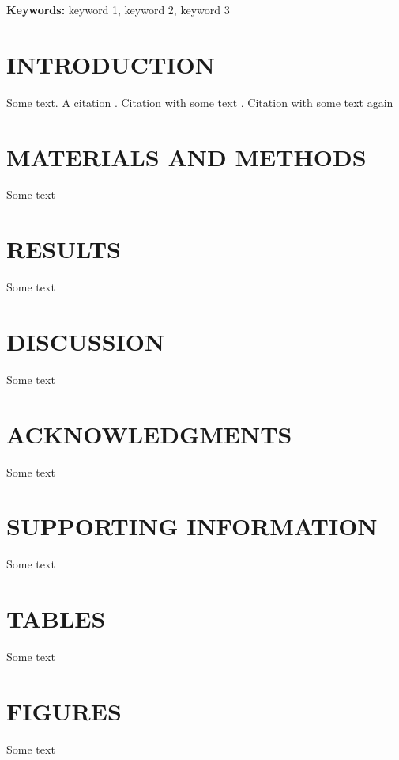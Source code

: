\documentclass[letterpaper,12pt]{article}
\begin{document}
\par \noindent \textbf{Keywords:} keyword 1, keyword 2, keyword 3




\clearpage
\section*{INTRODUCTION}
\par Some text. A citation \citep{wang2015stem}. Citation with some text \citep[here is some text before the citation;][]{wang2015stem}. Citation with some text again \citep[][some text after the citation]{holtta2017steady}




\section*{MATERIALS AND METHODS}
\par Some text




\section*{RESULTS}
\par Some text




\section*{DISCUSSION}
\par Some text




\section*{ACKNOWLEDGMENTS}
\par Some text




\section*{SUPPORTING INFORMATION}
\par Some text




\clearpage
\section*{TABLES}
\par Some text




\begin{singlespace}


\end{singlespace}




\clearpage
\section*{FIGURES}
\par Some text
\end{document}
